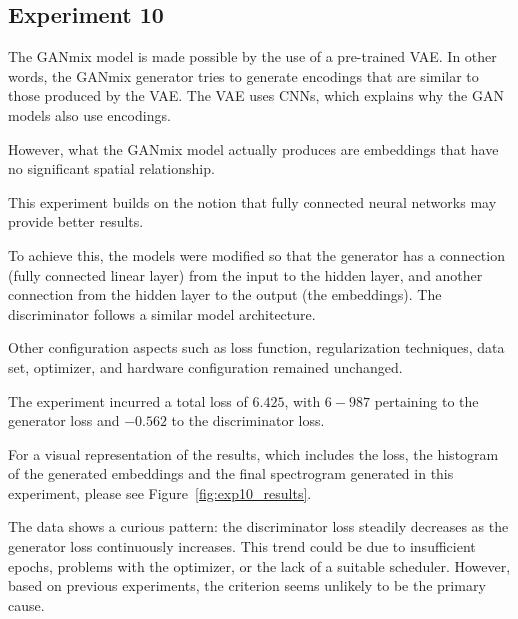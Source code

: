 \subsection{Experiment 10} \label{sec:exp10}

The GANmix model is made possible by the use of a pre-trained \ac{VAE}. In other words, the GANmix generator tries to generate encodings that are similar to those produced by the \ac{VAE}. The \ac{VAE} uses \acp{CNN}, which explains why the \ac{GAN} models also use encodings.

However, what the GANmix model actually produces are embeddings that have no significant spatial relationship.

This experiment builds on the notion that fully connected neural networks may provide better results.

To achieve this, the models were modified so that the generator has a connection (fully connected linear layer) from the input to the hidden layer, and another connection from the hidden layer to the output (the embeddings). The discriminator follows a similar model architecture.

Other configuration aspects such as loss function, regularization techniques, data set, optimizer, and hardware configuration remained unchanged.

The experiment incurred a total loss of $6.425$, with $6-987$ pertaining to the generator loss and $-0.562$ to the discriminator loss.

For a visual representation of the results, which includes the loss, the histogram of the generated embeddings and the final spectrogram generated in this experiment, please see Figure~\ref{fig:exp10_results}.

The data shows a curious pattern: the discriminator loss steadily decreases as the generator loss continuously increases. This trend could be due to insufficient epochs, problems with the optimizer, or the lack of a suitable scheduler. However, based on previous experiments, the criterion seems unlikely to be the primary cause.

